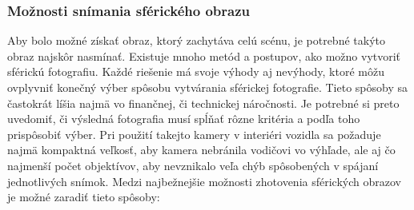 \documentclass[slovak,master,dept460,male,cpp,cpdeclaration]{diploma}
\begin{document}
\subsubsection*{Možnosti snímania sférického obrazu}
Aby  bolo možné získať obraz, ktorý zachytáva celú scénu, je potrebné takýto obraz najskôr nasmínať. Existuje mnoho metód a postupov, ako možno vytvoriť sférickú fotografiu. Každé riešenie má svoje výhody aj nevýhody, ktoré môžu ovplyvniť konečný výber spôsobu vytvárania sférickej fotografie. Tieto spôsoby sa  častokrát líšia najmä vo finančnej, či technickej náročnosti.  Je potrebné si preto uvedomiť, či  výsledná fotografia musí spĺňať rôzne kritéria a podľa toho prispôsobiť výber. Pri použití takejto kamery v interiéri vozidla sa požaduje najmä kompaktná veľkosť, aby kamera nebránila vodičovi vo výhľade, ale aj čo najmenší počet objektívov, aby nevznikalo veľa chýb spôsobených v spájaní jednotlivých snímok. Medzi najbežnejšie možnosti zhotovenia sférických obrazov je možné zaradiť tieto spôsoby:
\end{document}
